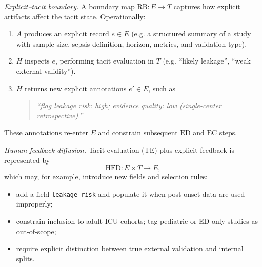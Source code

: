 \emph{Explicit--tacit boundary.}
A boundary map \(\mathrm{RB}: E \to T\) captures how explicit artifacts affect the tacit state. Operationally:
\begin{enumerate}
  \item \(A\) produces an explicit record \(e \in E\) (e.g. a structured summary of a study with sample size, sepsis definition, horizon, metrics, and validation type).
  \item \(H\) inspects \(e\), performing tacit evaluation in \(T\) (e.g. ``likely leakage'', ``weak external validity'').
  \item \(H\) returns new explicit annotations \(e' \in E\), such as
  \begin{quote}
    \emph{``flag leakage risk: high; evidence quality: low (single-center retrospective).''}
  \end{quote}
\end{enumerate}
These annotations re-enter \(E\) and constrain subsequent \(\mathrm{ED}\) and \(\mathrm{EC}\) steps.

\emph{Human feedback diffusion.}
Tacit evaluation (\(\mathrm{TE}\)) plus explicit feedback is represented by
\[
  \mathrm{HFD}: E \times T \to E,
\]
which may, for example, introduce new fields and selection rules:
\begin{itemize}
  \item add a field \verb|leakage_risk| and populate it when post-onset data are used improperly;
  \item constrain inclusion to adult ICU cohorts; tag pediatric or ED-only studies as out-of-scope;
  \item require explicit distinction between true external validation and internal splits.
\end{itemize}

